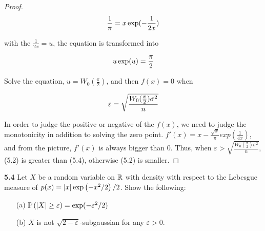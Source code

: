 \begin{proof}
	\begin{equation}
	\begin{aligned}
 	\notag
	\frac 1 \pi = x \exp(- \frac {1} {2x})
	\end{aligned}	
	\end{equation}

	with the $\frac 1 {2x} = u$, the equation is transformed into
	
	\begin{equation}
	\begin{aligned}
	\notag
	u \exp(u) = \frac {\pi} {2}
	\end{aligned}	
	\end{equation}

	Solve the equation, $u = W_0(\frac \pi 2)$, and then $f(x) = 0$ when

	\begin{equation}
	\begin{aligned}
	\notag
\varepsilon = \sqrt{\frac {W_0(\frac {\pi} {2}) \sigma^2} {n}}
	\end{aligned}	
	\end{equation}

	In order to judge the positive or negative of the $f(x)$, we need to judge the monotonicity in addition to solving the zero point. $f'(x) = x - \frac {\sqrt x}{\pi} exp(\frac 1 {4x})$, and from the picture, $f'(x)$ is always bigger than 0. Thus, when $\varepsilon > \sqrt{\frac {W_0(\frac {\pi} {2}) \sigma^2} {n}}$, (5.2) is greater than (5.4), otherwise (5.2) is smaller.


\end{proof}




\noindent\textbf{5.4} Let $X$ be a random variable on $\mathbb{R}$ with density with respect to the Lebesgue measure of $p(x)= \left| x \right|\exp\left(-x^2/2\right)/2$. Show the following:
\begin{enumerate}
	\item[(a)] $\mathbb{P} \left(\left| X \right|\ge \varepsilon\right) = \exp(-\varepsilon^2/2)$
	\item[(b)] $X$ is not $\sqrt{2-\varepsilon}$-subgaussian for any $\varepsilon>0$.
\end{enumerate}

